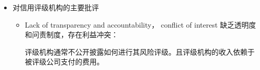 \begin{itemize}
\begin{itemize}
    \begin{itemize}
    \item a. Data Collection and Pre-processing 数据收集和预处理
        
    数据收集和预处理是信用评分/评级开发过程的首要步骤。
    
    收集违约/不违约的数据。
    
    数据预处理包括去除异常值、根据需要进行数据转换等。

    \item b. Model Fitting 模型拟合
        
确定最能描述(拟合)训练数据的模型参数 parameters。

比如线性回归模型，需要通过数据，找出参数 beta。

    \item c. Model Validation 模型验证


从模型拟合过程中得出的模型应使用与模型拟合所用样本不同的样本进行验证。

 Validation or holdout sample 验证样本或保留样本

使用样本外 (out-of-sample) 和时间外 (out-of-time) 数据进行回测（backtesting）， 来评估模型的预测性能。

        \item  d. Definition and Validation of Ratings 定义和验证评级

一旦信用评分模型通过验证，就需要把结果一一映射到不同的风险评级类别。

        \item e. Implementation 实施
        \begin{itemize}
            
            \item 最后阶段是将结果应用到信用评分/评级系统中，用于实时评估所有新申请贷款的信用风险。

            \item 经常进行监测和审查，并进行更新。
\end{itemize}
        \end{itemize}


\item    对信用评级机构的主要批评
        \begin{itemize}
        \item Lack of transparency and accountability， conflict of interest 缺乏透明度和问责制度，存在利益冲突：
        
        评级机构通常不公开披露如何进行其风险评级。且评级机构的收入依赖于被评级公司支付的费用。
        


\end{itemize}
\end{itemize}
\end{itemize}

